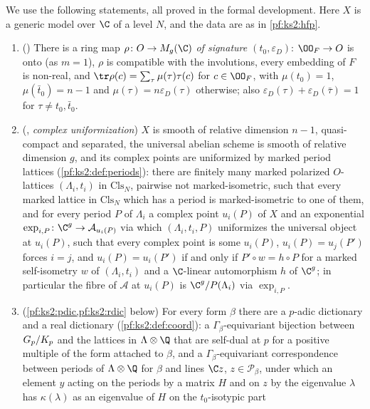 We use the following statements, all proved in the formal development. Here $X$ is a
generic model over $\C$ of a level $N$, and the data are as in \cref{pf:ks2:hfp}.
\begin{enumerate}[label=(U\arabic*)]
\item\label{pf:ks2:U:rho} () There is a ring map
  $\rho\colon O\to M_g(\C)$ \emph{of signature $(t_0,\varepsilon_D)$}: $\kstwoOF\to O$ is onto (as $m=1$), $\rho$ is compatible with
  the involutions, every embedding of $F$ is non-real, and
  $\tr\rho(c)=\sum_\tau\mu(\tau)\tau(c)$ for $c\in\kstwoOF$, with $\mu(t_0)=1$, $\mu(\bar t_0)=n-1$ and
  $\mu(\tau)=n\varepsilon_D(\tau)$ otherwise; also
  $\varepsilon_D(\tau)+\varepsilon_D(\bar\tau)=1$ for $\tau\ne t_0,\bar t_0$.
\item\label{pf:ks2:U:unif} (, \emph{complex uniformization})
  $X$ is smooth of relative dimension $n-1$, quasi-compact and separated, the universal abelian scheme
  is smooth of relative dimension $g$, and its complex points are uniformized by marked period
  lattices (\cref{pf:ks2:def:periods}): there are finitely many marked polarized $O$-lattices
  $(\Lambda_i,t_i)$ in $\mathrm{Cls}_N$, pairwise not marked-isometric, such that every marked lattice
  in $\mathrm{Cls}_N$ which has a period is marked-isometric to one of them, and for every period $P$
  of $\Lambda_i$ a complex point $u_i(P)$ of $X$ and an exponential
  $\exp_{i,P}\colon\C^g\to\mathcal A_{u_i(P)}$ via which $(\Lambda_i,t_i,P)$ uniformizes the universal
  object at $u_i(P)$, such that every complex point is some $u_i(P)$, $u_i(P)=u_j(P')$ forces $i=j$,
  and $u_i(P)=u_i(P')$ if and only if $P'\circ w=h\circ P$ for a marked self-isometry $w$ of
  $(\Lambda_i,t_i)$ and a $\C$-linear automorphism $h$ of $\C^g$; in particular the fibre of
  $\mathcal A$ at $u_i(P)$ is $\C^g/P(\Lambda_i)$ via $\exp_{i,P}$.
\item\label{pf:ks2:U:dic} (\cref{pf:ks2:pdic,pf:ks2:rdic} below) For every form $\beta$ there are a
  $p$-adic dictionary and a real dictionary (\cref{pf:ks2:def:coord}): a $\Gamma_\beta$-equivariant
  bijection between $G_{p}/K_{p}$ and the lattices in $\Lambda\otimes\Q$ that are self-dual at
  $p$ for a positive multiple of the form attached to $\beta$, and a $\Gamma_\beta$-equivariant
  correspondence between periods of $\Lambda\otimes\Q$ for $\beta$ and lines $\C z$,
  $z\in\mathcal{P}_\beta$, under which an element $y$ acting on the periods by a matrix $H$ and on $z$
  by the eigenvalue $\lambda$ has $\kappa(\lambda)$ as an eigenvalue of $H$ on the $t_0$-isotypic part

\end{enumerate}
